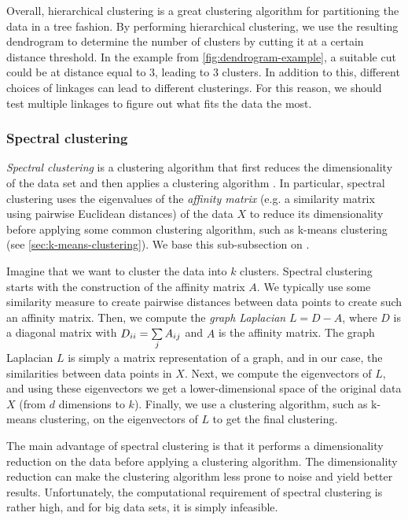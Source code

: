 Overall, hierarchical clustering is a great clustering algorithm for partitioning the data in a tree fashion. By performing hierarchical clustering, we use the resulting dendrogram to determine the number of clusters by cutting it at a certain distance threshold. In the example from \cref{fig:dendrogram-example}, a suitable cut could be at distance equal to 3, leading to 3 clusters. In addition to this, different choices of linkages can lead to different clusterings. For this reason, we should test multiple linkages to figure out what fits the data the most.

\subsubsection{Spectral clustering}
\label{sec:spectral-clustering}
\textit{Spectral clustering} is a clustering algorithm that first reduces the dimensionality of the data set and then applies a clustering algorithm \cite{Andrew2002}. In particular, spectral clustering uses the eigenvalues of the \textit{affinity matrix} (e.g. a similarity matrix using pairwise Euclidean distances) of the data $X$ to reduce its dimensionality before applying some common clustering algorithm, such as k-means clustering (see \cref{sec:k-means-clustering}). We base this sub-subsection on \cite{Andrew2002}.

Imagine that we want to cluster the data into $k$ clusters. Spectral clustering starts with the construction of the affinity matrix $A$. We typically use some similarity measure to create pairwise distances between data points to create such an affinity matrix. Then, we compute the \textit{graph Laplacian} $L = D - A$, where $D$ is a diagonal matrix with $D_{ii} = \sum\limits_{j}^{} A_{ij}$ and $A$ is the affinity matrix. The graph Laplacian $L$ is simply a matrix representation of a graph, and in our case, the similarities between data points in $X$. Next, we compute the eigenvectors of $L$, and using these eigenvectors we get a lower-dimensional space of the original data $X$ (from $d$ dimensions to $k$). Finally, we use a clustering algorithm, such as k-means clustering, on the eigenvectors of $L$ to get the final clustering.

The main advantage of spectral clustering is that it performs a dimensionality reduction on the data before applying a clustering algorithm. The dimensionality reduction can make the clustering algorithm less prone to noise and yield better results. Unfortunately, the computational requirement of spectral clustering is rather high, and for big data sets, it is simply infeasible.

